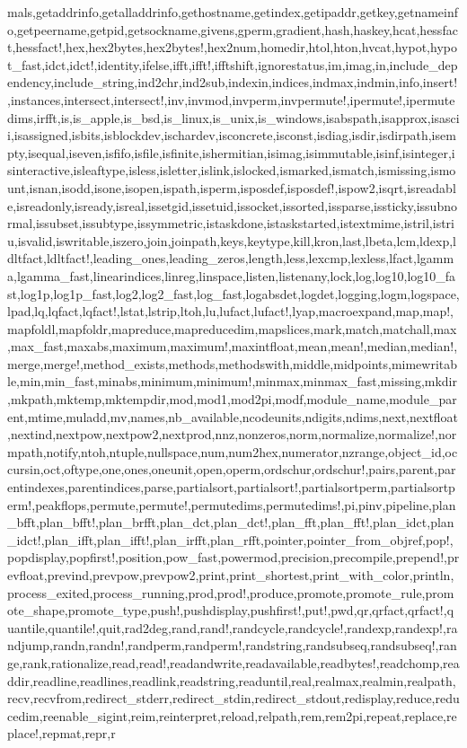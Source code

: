 {mals,getaddrinfo,getalladdrinfo,gethostname,getindex,getipaddr,getkey,getnameinfo,getpeername,getpid,getsockname,givens,gperm,gradient,hash,haskey,hcat,hessfact,hessfact!,hex,hex2bytes,hex2bytes!,hex2num,homedir,htol,hton,hvcat,hypot,hypot_fast,idct,idct!,identity,ifelse,ifft,ifft!,ifftshift,ignorestatus,im,imag,in,include_dependency,include_string,ind2chr,ind2sub,indexin,indices,indmax,indmin,info,insert!,instances,intersect,intersect!,inv,invmod,invperm,invpermute!,ipermute!,ipermutedims,irfft,is,is_apple,is_bsd,is_linux,is_unix,is_windows,isabspath,isapprox,isascii,isassigned,isbits,isblockdev,ischardev,isconcrete,isconst,isdiag,isdir,isdirpath,isempty,isequal,iseven,isfifo,isfile,isfinite,ishermitian,isimag,isimmutable,isinf,isinteger,isinteractive,isleaftype,isless,isletter,islink,islocked,ismarked,ismatch,ismissing,ismount,isnan,isodd,isone,isopen,ispath,isperm,isposdef,isposdef!,ispow2,isqrt,isreadable,isreadonly,isready,isreal,issetgid,issetuid,issocket,issorted,issparse,issticky,issubnormal,issubset,issubtype,issymmetric,istaskdone,istaskstarted,istextmime,istril,istriu,isvalid,iswritable,iszero,join,joinpath,keys,keytype,kill,kron,last,lbeta,lcm,ldexp,ldltfact,ldltfact!,leading_ones,leading_zeros,length,less,lexcmp,lexless,lfact,lgamma,lgamma_fast,linearindices,linreg,linspace,listen,listenany,lock,log,log10,log10_fast,log1p,log1p_fast,log2,log2_fast,log_fast,logabsdet,logdet,logging,logm,logspace,lpad,lq,lqfact,lqfact!,lstat,lstrip,ltoh,lu,lufact,lufact!,lyap,macroexpand,map,map!,mapfoldl,mapfoldr,mapreduce,mapreducedim,mapslices,mark,match,matchall,max,max_fast,maxabs,maximum,maximum!,maxintfloat,mean,mean!,median,median!,merge,merge!,method_exists,methods,methodswith,middle,midpoints,mimewritable,min,min_fast,minabs,minimum,minimum!,minmax,minmax_fast,missing,mkdir,mkpath,mktemp,mktempdir,mod,mod1,mod2pi,modf,module_name,module_parent,mtime,muladd,mv,names,nb_available,ncodeunits,ndigits,ndims,next,nextfloat,nextind,nextpow,nextpow2,nextprod,nnz,nonzeros,norm,normalize,normalize!,normpath,notify,ntoh,ntuple,nullspace,num,num2hex,numerator,nzrange,object_id,occursin,oct,oftype,one,ones,oneunit,open,operm,ordschur,ordschur!,pairs,parent,parentindexes,parentindices,parse,partialsort,partialsort!,partialsortperm,partialsortperm!,peakflops,permute,permute!,permutedims,permutedims!,pi,pinv,pipeline,plan_bfft,plan_bfft!,plan_brfft,plan_dct,plan_dct!,plan_fft,plan_fft!,plan_idct,plan_idct!,plan_ifft,plan_ifft!,plan_irfft,plan_rfft,pointer,pointer_from_objref,pop!,popdisplay,popfirst!,position,pow_fast,powermod,precision,precompile,prepend!,prevfloat,prevind,prevpow,prevpow2,print,print_shortest,print_with_color,println,process_exited,process_running,prod,prod!,produce,promote,promote_rule,promote_shape,promote_type,push!,pushdisplay,pushfirst!,put!,pwd,qr,qrfact,qrfact!,quantile,quantile!,quit,rad2deg,rand,rand!,randcycle,randcycle!,randexp,randexp!,randjump,randn,randn!,randperm,randperm!,randstring,randsubseq,randsubseq!,range,rank,rationalize,read,read!,readandwrite,readavailable,readbytes!,readchomp,readdir,readline,readlines,readlink,readstring,readuntil,real,realmax,realmin,realpath,recv,recvfrom,redirect_stderr,redirect_stdin,redirect_stdout,redisplay,reduce,reducedim,reenable_sigint,reim,reinterpret,reload,relpath,rem,rem2pi,repeat,replace,replace!,repmat,repr,r}
